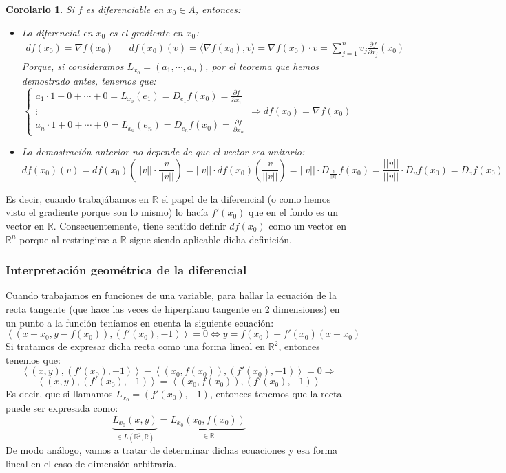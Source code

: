\documentclass[10pt,a4paper,openright]{book}
\theoremstyle{break}
\newtheorem*{coro}{Corolario}
\begin{document}
\begin{coro}
Si $f$ es diferenciable en $x_0\in A$, entonces:
\begin{itemize}
\item La diferencial en $x_0$ es el gradiente en $x_0$:
	\begin{align*}
df(x_0) = \nabla f(x_0)& & df(x_0)(v) = \langle \nabla f(x_0), v\rangle = \nabla f(x_0) \cdot v = \sum_{j = 1}^{n}v_j \frac{\partial f}{\partial x_j}(x_0)
	\end{align*}
	Porque,  si consideramos $L_{x_0} = (a_1, \cdots , a_n)$, por el teorema que hemos demostrado antes, tenemos que:
	$$\begin{cases} a_1 \cdot 1 + 0 + \cdots + 0 = L_{x_0}(e_1)= D_{e_1} f(x_0) = \frac{\partial f}{\partial x_1} \\ \vdots \\ a_n \cdot 1 + 0 + \cdots + 0 = L_{x_0}(e_n)= D_{e_n} f(x_0) = \frac{\partial f}{\partial x_n} \end{cases} \Rightarrow df(x_0) = \nabla f(x_0)$$
		
\item La demostración anterior no depende de que el vector sea unitario:
$$df(x_0)(v) = df(x_0)\left(||v|| \cdot \frac{v}{||v||}\right) = ||v|| \cdot df(x_0)\left(\frac{v}{||v||}\right) = ||v|| \cdot D_{\frac{v}{||v||}}f(x_0) = \frac{||v||}{||v||}\cdot D_v f(x_0)= D_v f(x_0)$$
\end{itemize}
\end{coro}
Es decir, cuando trabajábamos en $\mathbb{R}$ el papel de la diferencial (o como hemos visto el gradiente porque son lo mismo) lo hacía $f'(x_0)$ que en el fondo es un vector en $\mathbb{R}$. Consecuentemente, tiene sentido definir $df(x_0)$ como un vector en $\mathbb{R}^n$ porque al restringirse a $\mathbb{R}$ sigue siendo aplicable dicha definición.

\subsubsection*{Interpretación geométrica de la diferencial}
Cuando trabajamos en funciones de una variable, para hallar la ecuación de la recta tangente (que hace las veces de hiperplano tangente en 2 dimensiones) en un punto a la función teníamos en cuenta la siguiente ecuación:
$$\left\langle (x-x_0, y-f(x_0)), (f'(x_0), -1)\right\rangle = 0 \Leftrightarrow y = f(x_0)+f'(x_0)(x-x_0)$$
Si tratamos de expresar dicha recta como una forma lineal en $\mathbb{R}^2$, entonces tenemos que:
$$\left\langle (x,y), (f'(x_0), -1)\right\rangle - \left\langle (x_0, f(x_0)), (f'(x_0), -1)\right\rangle = 0 \Rightarrow$$
$$\left\langle (x,y), (f'(x_0), -1)\right\rangle = \left\langle (x_0, f(x_0)), (f'(x_0), -1)\right\rangle$$
Es decir, que si llamamos $L_{x_0} = (f'(x_0), -1)$, entonces tenemos que la recta puede ser expresada como:
$$\underbrace{L_{x_0}(x,y)}_{\in L(\mathbb{R}^2, \mathbb{R})} = \underbrace{L_{x_0}(x_0, f(x_0))}_{\in \mathbb{R}}$$
De modo análogo, vamos a tratar de determinar dichas ecuaciones y esa forma lineal en el caso de dimensión arbitraria.
\end{document}
